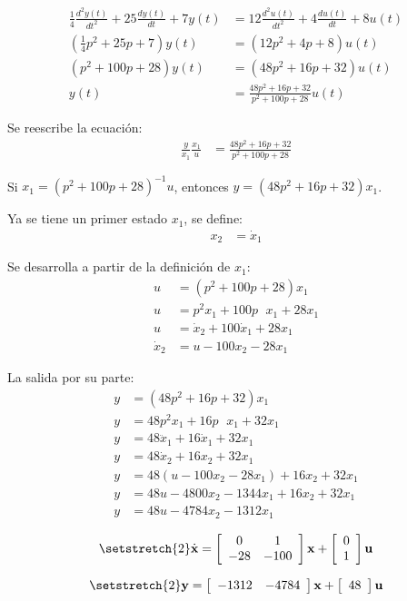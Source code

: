 \begin{align*}
  \frac{1}{4}\frac{d^2y(t)}{dt^2} + 25 \frac{dy(t)}{dt} + 7 y(t)
  &= 12 \frac{d^2u(t)}{dt^2} + 4 \frac{du(t)}{dt} + 8u(t)
  \\
  \left( \frac{1}{4}p^2 + 25p + 7 \right) y(t)
  &= \left(12p^2 + 4p + 8\right) u(t)
  \\
  \left( p^2 + 100p + 28 \right) y(t)
  &= \left(48p^2 + 16p + 32\right) u(t)
  \\
  y(t) &= \frac{48p^2 + 16p + 32}{p^2 + 100p + 28} u(t)
\end{align*}

Se reescribe la ecuación:
\begin{align*}
  \frac{y}{x_1} \frac{x_1}{u} &= \frac{48p^2 + 16p + 32}{p^2 + 100p + 28}
\end{align*}

Si $x_1 = \left(p^2 + 100p + 28\right)^{-1}u$, entonces $y = (48p^2 + 16p + 32)x_1$.

Ya se tiene un primer estado $x_1$, se define:
\begin{align*}
  x_2 &= \dot{x}_1
\end{align*}

Se desarrolla a partir de la definición de $x_1$:
\begin{align*}
  u &= \left(p^2 + 100p + 28\right)x_1 \\
  u &= p^2 x_1 + 100p \phantom{\cdot} x_1 + 28 x_1 \\
  u &= \dot{x}_2 + 100 \dot{x}_1 + 28 x_1 \\
  \dot{x}_2 &= u - 100 x_2 - 28 x_1
\end{align*}

La salida por su parte:
\begin{align*}
  y &= (48p^2 + 16p + 32)x_1 \\
  y &= 48p^2 x_1 + 16p\phantom{\cdot} x_1 + 32 x_1 \\
  y &= 48 \ddot{x}_1 + 16 \dot{x}_1 + 32 x_1 \\
  y &= 48 \dot{x}_2 + 16 x_2 + 32 x_1 \\
  y &= 48 (u - 100 x_2 - 28 x_1) + 16 x_2 + 32 x_1 \\
  y &= 48 u - 4800 x_2 - 1344 x_1 + 16 x_2 + 32 x_1 \\
  y &= 48 u - 4784 x_2 - 1312 x_1
\end{align*}

\[ \setstretch{2}
  \dot{\textbf{x}}=
  \left[
    {\begin{array}{cc}
      0   & 1    \\
      -28 & -100 \\
    \end{array}}
  \right]
  \textbf{x} +
  \left[
    {\begin{array}{cc}
      0 \\
      1 \\
    \end{array}}
  \right]
  \textbf{u}
\]

\[ \setstretch{2}
  \textbf{y}=
  \left[
    {\begin{array}{ccc}
      -1312 & -4784 \\
    \end{array}}
  \right]
  \textbf{x} +
  \left[
    {\begin{array}{c}
      48 \\
    \end{array}}
  \right]
  \textbf{u}
\]

